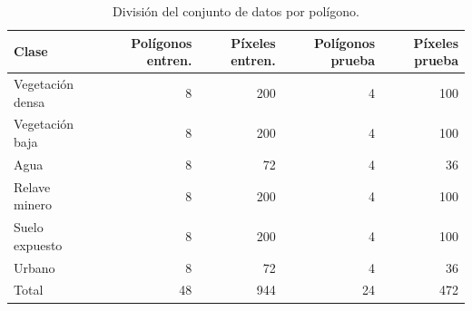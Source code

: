 \begin{table}[htbp]
 \centering
 \caption{División del conjunto de datos por polígono.}
 \label{tab:division}
 \begin{tabular}{lrrrr}
  \toprule
  Clase & Polígonos entren. & Píxeles entren. & Polígonos prueba & Píxeles prueba \\
  \midrule
  Vegetación densa & 8 & 200 & 4 & 100 \\
  Vegetación baja & 8 & 200 & 4 & 100 \\
  Agua & 8 & 72 & 4 & 36 \\
  Relave minero & 8 & 200 & 4 & 100 \\
  Suelo expuesto & 8 & 200 & 4 & 100 \\
  Urbano & 8 & 72 & 4 & 36 \\
  \midrule
  Total & 48 & 944 & 24 & 472 \\
  \bottomrule
 \end{tabular}
\end{table}
